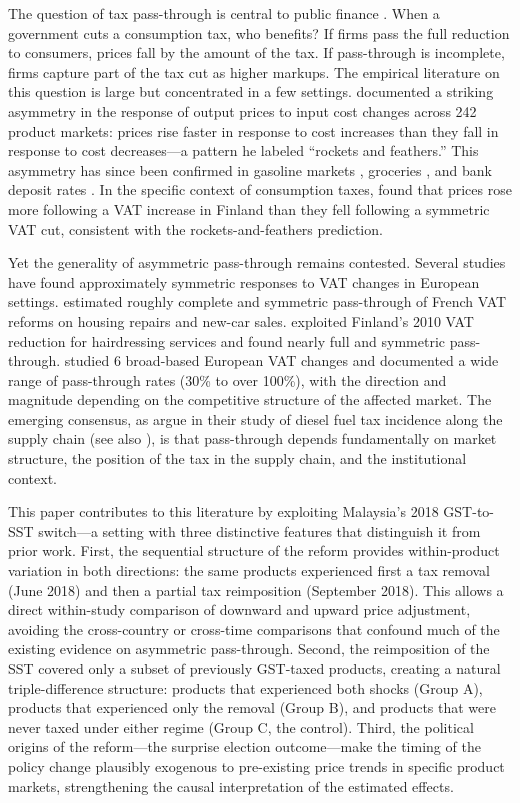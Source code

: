\documentclass[12pt]{article}
\begin{document}
The question of tax pass-through is central to public finance \citep{fullerton2012}. When a government cuts a consumption tax, who benefits? If firms pass the full reduction to consumers, prices fall by the amount of the tax. If pass-through is incomplete, firms capture part of the tax cut as higher markups. The empirical literature on this question is large but concentrated in a few settings. \citet{peltzman2000} documented a striking asymmetry in the response of output prices to input cost changes across 242 product markets: prices rise faster in response to cost increases than they fall in response to cost decreases---a pattern he labeled ``rockets and feathers.'' This asymmetry has since been confirmed in gasoline markets \citep{bacon1991, borenstein1997, deltas2008}, groceries \citep{peltzman2000}, and bank deposit rates \citep{hannan1991}. In the specific context of consumption taxes, \citet{benzarti2020} found that prices rose more following a VAT increase in Finland than they fell following a symmetric VAT cut, consistent with the rockets-and-feathers prediction.

Yet the generality of asymmetric pass-through remains contested. Several studies have found approximately symmetric responses to VAT changes in European settings. \citet{carbonnier2007} estimated roughly complete and symmetric pass-through of French VAT reforms on housing repairs and new-car sales. \citet{kosonen2015} exploited Finland's 2010 VAT reduction for hairdressing services and found nearly full and symmetric pass-through. \citet{benedek2020} studied 6 broad-based European VAT changes and documented a wide range of pass-through rates (30\% to over 100\%), with the direction and magnitude depending on the competitive structure of the affected market. The emerging consensus, as \citet{kopczuk2016} argue in their study of diesel fuel tax incidence along the supply chain (see also \citealp{marion2011}), is that pass-through depends fundamentally on market structure, the position of the tax in the supply chain, and the institutional context.

This paper contributes to this literature by exploiting Malaysia's 2018 GST-to-SST switch---a setting with three distinctive features that distinguish it from prior work. First, the sequential structure of the reform provides within-product variation in both directions: the same products experienced first a tax removal (June 2018) and then a partial tax reimposition (September 2018). This allows a direct within-study comparison of downward and upward price adjustment, avoiding the cross-country or cross-time comparisons that confound much of the existing evidence on asymmetric pass-through. Second, the reimposition of the SST covered only a subset of previously GST-taxed products, creating a natural triple-difference structure: products that experienced both shocks (Group A), products that experienced only the removal (Group B), and products that were never taxed under either regime (Group C, the control). Third, the political origins of the reform---the surprise election outcome---make the timing of the policy change plausibly exogenous to pre-existing price trends in specific product markets, strengthening the causal interpretation of the estimated effects.
\end{document}
